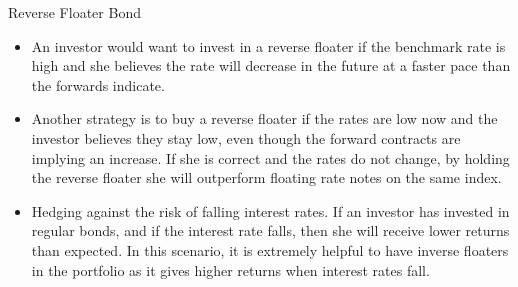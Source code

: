 \documentclass{beamer}
\begin{document}
\begin{frame}{Reverse Floater Bond}
	\begin{itemize}
		\item<1-> An investor would want to invest in a reverse floater if the benchmark rate is high and she believes the rate will decrease in the future at a faster pace than the forwards indicate. 
		\item<2-> Another strategy is to buy a reverse floater if the rates are low now and the investor believes they stay low, even though the forward contracts are implying an increase. If she is correct and the rates do not change, by holding the reverse floater she will outperform floating rate notes on the same index.
		\item<3-> Hedging against the risk of falling interest rates. If an investor has invested in regular bonds, and if the interest rate falls, then she will receive lower returns than expected. In this scenario, it is extremely helpful to have inverse floaters in the portfolio as it gives higher returns when interest rates fall.
	\end{itemize}
\end{frame}
\end{document}
